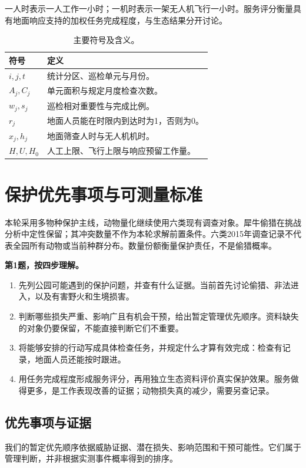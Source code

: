 \documentclass[12pt,a4paper]{article}
\numberwithin{equation}{section}
\begin{document}
一人时表示一人工作一小时；一机时表示一架无人机飞行一小时。服务评分衡量具有地面响应支持的加权任务完成程度，与生态结果分开讨论。

\begin{table}[H]
\centering\fontsize{12}{14.4}\selectfont
\caption{主要符号及含义。}
\label{tab:terms}
\begin{tabularx}{\linewidth}{>{\raggedright\arraybackslash}p{2.1cm}>{\raggedright\arraybackslash}X}
\toprule
符号 & 定义 \\
\midrule
$i,j,t$ & 统计分区、巡检单元与月份。 \\
$A_j,C_j$ & 单元面积与规定月度检查次数。 \\
$w_j,s_j$ & 巡检相对重要性与完成比例。 \\
$r_j$ & 地面人员能在时限内到达时为1，否则为0。 \\
$x_j,h_j$ & 地面筛查人时与无人机机时。 \\
$H,U,H_0$ & 人工上限、飞行上限与响应预留工作量。 \\
\bottomrule
\end{tabularx}
\end{table}
\clearpage

\section{保护优先事项与可测量标准}
本轮采用多物种保护主线，动物量化继续使用六类现有调查对象。犀牛偷猎在挑战分析中定性保留；其冲突数量不作为本轮求解前置条件。六类2015年调查记录不代表全园所有动物或当前种群分布。数量份额衡量保护责任，不是偷猎概率。

\noindent\textbf{第1题，按四步理解。}
\begin{enumerate}
\item 先列公园可能遇到的保护问题，并查有什么证据。当前首先讨论偷猎、非法进入，以及有害野火和生境损害。
\item 判断哪些损失严重、影响广且有机会干预，给出暂定管理优先顺序。资料缺失的对象仍要保留，不能直接判断它们不重要。
\item 将能够安排的行动写成具体检查任务，并规定什么才算有效完成：检查有记录，地面人员还能按时跟进。
\item 用任务完成程度形成服务评分，再用独立生态资料评价真实保护效果。服务做得更多，是工作表现改善的证据；动物损失真的减少，需要另查记录。
\end{enumerate}

\subsection{优先事项与证据}
我们的暂定优先顺序依据威胁证据、潜在损失、影响范围和干预可能性。它们属于管理判断，并非根据实测事件概率得到的排序。
\end{document}
